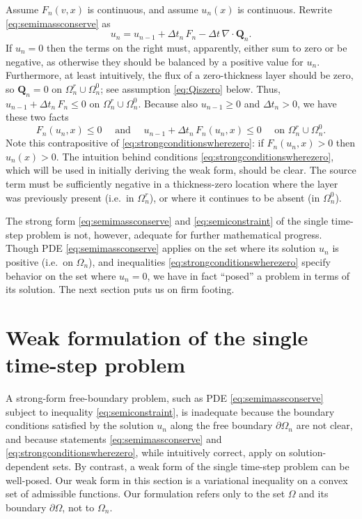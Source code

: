 \documentclass[final,leqno,onefignum,onetabnum]{siamltex1213bueler}
\newcommand\bQ{\mathbf{Q}}
\newcommand{\Div}{\nabla\cdot}
\begin{document}
Assume $F_n(v,x)$ is continuous, and assume $u_n(x)$ is continuous.  Rewrite \eqref{eq:semimassconserve} as
    $$u_n = u_{n-1} + \Delta t_n\, F_n - \Delta t\, \Div \bQ_n.$$
If $u_n=0$ then the terms on the right must, apparently, either sum to zero or be negative, as otherwise they should be balanced by a positive value for $u_n$.  Furthermore, at least intuitively, the flux of a zero-thickness layer should be zero, so $\bQ_n=0$ on $\Omega_n^r \cup \Omega_n^0$; see assumption \eqref{eq:Qiszero} below.  Thus, $u_{n-1}+\Delta t_n\, F_n \le 0$ on $\Omega_n^r \cup \Omega_n^0$.  Because also $u_{n-1}\ge 0$ and $\Delta t_n > 0$, we have these two facts
\begin{equation}
F_n(u_n,x) \le 0 \quad \text{ and } \quad u_{n-1} + \Delta t_n\, F_n(u_n,x) \le 0 \quad \text{ on } \Omega_n^r \cup \Omega_n^0. \label{eq:strongconditionswherezero}
\end{equation}
Note this contrapositive of \eqref{eq:strongconditionswherezero}: if $F_n(u_n,x)>0$ then $u_n(x)>0$.  The intuition behind conditions \eqref{eq:strongconditionswherezero}, which will be used in initially deriving the weak form, should be clear.  The source term must be sufficiently negative in a thickness-zero location where the layer was previously present (i.e.~in $\Omega_n^r$), or where it continues to be absent (in $\Omega_n^0$).

The strong form \eqref{eq:semimassconserve} and \eqref{eq:semiconstraint} of the single time-step problem is not, however, adequate for further mathematical progress.  Though PDE \eqref{eq:semimassconserve} applies on the set where its solution $u_n$ is positive (i.e.~on $\Omega_n$), and inequalities \eqref{eq:strongconditionswherezero} specify behavior on the set where $u_n=0$, we have in fact ``posed'' a problem in terms of its solution.  The next section puts us on firm footing.


\section{Weak formulation of the single time-step problem}  \label{sec:weakform}

A strong-form free-boundary problem, such as PDE \eqref{eq:semimassconserve} subject to inequality \eqref{eq:semiconstraint}, is inadequate because the boundary conditions satisfied by the solution $u_n$ along the free boundary $\partial\Omega_n$ are not clear, and because statements \eqref{eq:semimassconserve} and \eqref{eq:strongconditionswherezero}, while intuitively correct, apply on solution-dependent sets.  By contrast, a weak form of the single time-step problem can be well-posed.  Our weak form in this section is a variational inequality \cite{Friedman1982,KinderlehrerStampacchia1980} on a convex set of admissible functions.  Our formulation refers only to the set $\Omega$ and its boundary $\partial\Omega$, not to $\Omega_n$.
\end{document}
